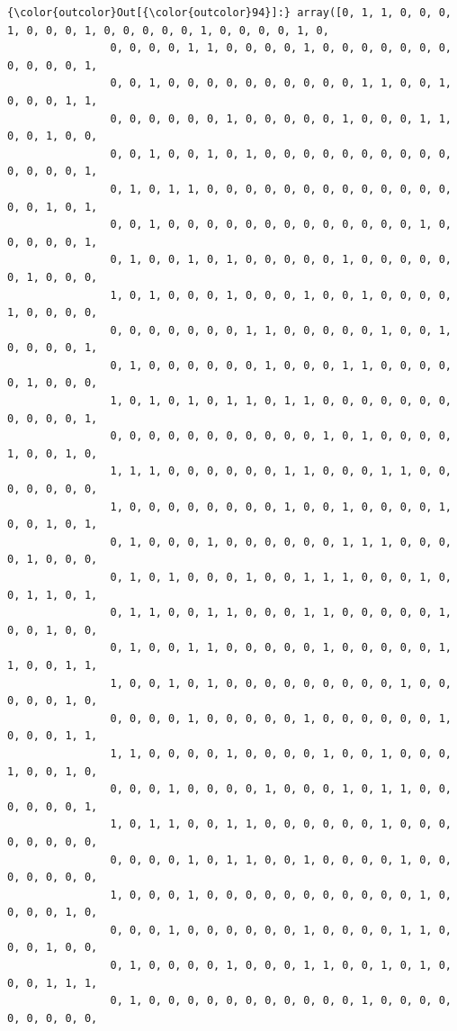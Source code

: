 \documentclass[11pt]{article}
\begin{document}
\begin{Verbatim}[commandchars=\\\{\}]
{\color{outcolor}Out[{\color{outcolor}94}]:} array([0, 1, 1, 0, 0, 0, 1, 0, 0, 0, 1, 0, 0, 0, 0, 0, 1, 0, 0, 0, 0, 1, 0,
                0, 0, 0, 0, 1, 1, 0, 0, 0, 0, 1, 0, 0, 0, 0, 0, 0, 0, 0, 0, 0, 0, 1,
                0, 0, 1, 0, 0, 0, 0, 0, 0, 0, 0, 0, 0, 1, 1, 0, 0, 1, 0, 0, 0, 1, 1,
                0, 0, 0, 0, 0, 0, 1, 0, 0, 0, 0, 0, 1, 0, 0, 0, 1, 1, 0, 0, 1, 0, 0,
                0, 0, 1, 0, 0, 1, 0, 1, 0, 0, 0, 0, 0, 0, 0, 0, 0, 0, 0, 0, 0, 0, 1,
                0, 1, 0, 1, 1, 0, 0, 0, 0, 0, 0, 0, 0, 0, 0, 0, 0, 0, 0, 0, 1, 0, 1,
                0, 0, 1, 0, 0, 0, 0, 0, 0, 0, 0, 0, 0, 0, 0, 0, 1, 0, 0, 0, 0, 0, 1,
                0, 1, 0, 0, 1, 0, 1, 0, 0, 0, 0, 0, 1, 0, 0, 0, 0, 0, 0, 1, 0, 0, 0,
                1, 0, 1, 0, 0, 0, 1, 0, 0, 0, 1, 0, 0, 1, 0, 0, 0, 0, 1, 0, 0, 0, 0,
                0, 0, 0, 0, 0, 0, 0, 1, 1, 0, 0, 0, 0, 0, 1, 0, 0, 1, 0, 0, 0, 0, 1,
                0, 1, 0, 0, 0, 0, 0, 0, 1, 0, 0, 0, 1, 1, 0, 0, 0, 0, 0, 1, 0, 0, 0,
                1, 0, 1, 0, 1, 0, 1, 1, 0, 1, 1, 0, 0, 0, 0, 0, 0, 0, 0, 0, 0, 0, 1,
                0, 0, 0, 0, 0, 0, 0, 0, 0, 0, 0, 1, 0, 1, 0, 0, 0, 0, 1, 0, 0, 1, 0,
                1, 1, 1, 0, 0, 0, 0, 0, 0, 1, 1, 0, 0, 0, 1, 1, 0, 0, 0, 0, 0, 0, 0,
                1, 0, 0, 0, 0, 0, 0, 0, 0, 1, 0, 0, 1, 0, 0, 0, 0, 1, 0, 0, 1, 0, 1,
                0, 1, 0, 0, 0, 1, 0, 0, 0, 0, 0, 0, 1, 1, 1, 0, 0, 0, 0, 1, 0, 0, 0,
                0, 1, 0, 1, 0, 0, 0, 1, 0, 0, 1, 1, 1, 0, 0, 0, 1, 0, 0, 1, 1, 0, 1,
                0, 1, 1, 0, 0, 1, 1, 0, 0, 0, 1, 1, 0, 0, 0, 0, 0, 1, 0, 0, 1, 0, 0,
                0, 1, 0, 0, 1, 1, 0, 0, 0, 0, 0, 1, 0, 0, 0, 0, 0, 1, 1, 0, 0, 1, 1,
                1, 0, 0, 1, 0, 1, 0, 0, 0, 0, 0, 0, 0, 0, 0, 1, 0, 0, 0, 0, 0, 1, 0,
                0, 0, 0, 0, 1, 0, 0, 0, 0, 0, 1, 0, 0, 0, 0, 0, 0, 1, 0, 0, 0, 1, 1,
                1, 1, 0, 0, 0, 0, 1, 0, 0, 0, 0, 1, 0, 0, 1, 0, 0, 0, 1, 0, 0, 1, 0,
                0, 0, 0, 1, 0, 0, 0, 0, 1, 0, 0, 0, 1, 0, 1, 1, 0, 0, 0, 0, 0, 0, 1,
                1, 0, 1, 1, 0, 0, 1, 1, 0, 0, 0, 0, 0, 0, 1, 0, 0, 0, 0, 0, 0, 0, 0,
                0, 0, 0, 0, 1, 0, 1, 1, 0, 0, 1, 0, 0, 0, 0, 1, 0, 0, 0, 0, 0, 0, 0,
                1, 0, 0, 0, 1, 0, 0, 0, 0, 0, 0, 0, 0, 0, 0, 0, 1, 0, 0, 0, 0, 1, 0,
                0, 0, 0, 1, 0, 0, 0, 0, 0, 0, 1, 0, 0, 0, 0, 1, 1, 0, 0, 0, 1, 0, 0,
                0, 1, 0, 0, 0, 0, 1, 0, 0, 0, 1, 1, 0, 0, 1, 0, 1, 0, 0, 0, 1, 1, 1,
                0, 1, 0, 0, 0, 0, 0, 0, 0, 0, 0, 0, 0, 1, 0, 0, 0, 0, 0, 0, 0, 0, 0,

\end{Verbatim}
\end{document}
